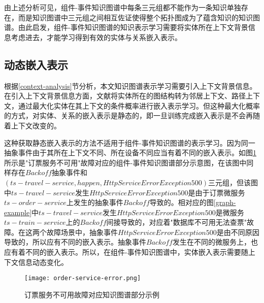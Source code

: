 由上述分析可见，组件-事件知识图谱中每条三元组都不能作为一条知识单独存在，而是知识图谱中三元组之间相互佐证使得整个拓扑图成为了蕴含知识的知识图谱。由此启发，组件-事件知识图谱的知识表示学习需要将实体所在上下文背景信息考虑进去，才能学习得到有效的实体与关系嵌入表示。
\subsection{动态嵌入表示}
根据\ref{context-analysis}节分析，本文知识图谱表示学习需要引入上下文背景信息。在引入上下文背景信息方面，文献\parencite{feng2016gake,shi2017knowledge}将实体所在的图结构转为邻居上下文、路径上下文，通过最大化实体在其上下文的条件概率进行嵌入表示学习。但这种最大化概率的方式，对实体、关系的嵌入表示是静态的，即一旦训练完成嵌入表示是不会再随着上下文改变的。

这种获取静态嵌入表示的方法不适用于组件-事件知识图谱的表示学习。因为同一抽象事件由于其所在上下文不同、所在设备不同应当有着不同的嵌入表示。如图\ref{order-service-error}所示是"订票服务不可用"故障对应的组件-事件知识图谱部分示意图，在该图中同样存在$Backoff$抽象事件和$\left(ts-travel-service, happen, HttpServiceError Exception 500\right)$三元组，但该图中$ts-travel-service$发生$HttpServiceError Exception 500$是由于订票微服务$ts-order-service$上发生的抽象事件$Backoff$导致的。相对应的图\ref{graph-example}中$ts-travel-service$发生$HttpServiceError Exception 500$是微服务$ts-train-service$上的$Backoff$间接导致的，对应着"数据库不可用无法查票"故障。在这两个故障场景中，抽象事件$HttpServiceError Exception 500$是由不同原因导致的，所以应有不同的嵌入表示。抽象事件$Backoff$发生在不同的微服务上，也应有着不同的嵌入表示。所以，在组件-事件知识图谱中，实体嵌入表示需要随上下文信息动态变化。
\begin{figure}[htbp]
    \centering
    \texttt{[image: order-service-error.png]}
    \caption{订票服务不可用故障对应知识图谱部分示例\label{order-service-error}}
\end{figure}

